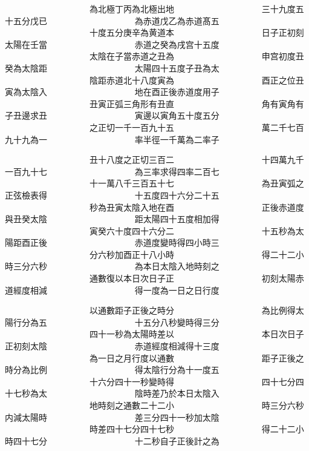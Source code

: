 \begin{正文}
　　　　　　　　　　為北極丁丙為北極出地
　　　　　　　　　　三十九度五十五分戊已
　　　　　　　　　　為赤道戊乙為赤道髙五
　　　　　　　　　　十度五分庚辛為黄道本
　　　　　　　　　　日子正初刻太陽在壬當
　　　　　　　　　　赤道之癸為戌宫十五度
　　　　　　　　　　太陰在子當赤道之丑為
　　　　　　　　　　申宫初度丑癸為太陰距
　　　　　　　　　　太陽四十五度子丑為太
　　　　　　　　　　陰距赤道北十八度寅為
　　　　　　　　　　酉正之位丑寅為太陰入
　　　　　　　　　　地在酉正後赤道度用子
　　　　　　　　　　丑寅正弧三角形有丑直
　　　　　　　　　　角有寅角有子丑邊求丑
　　　　　　　　　　寅邊以寅角五十度五分
　　　　　　　　　　之正切一千一百九十五
　　　　　　　　　　萬二千七百九十九為一
　　　　　　　　　　率半徑一千萬為二率子
\par
\end{正文}\clearpage
{}
\begin{正文}
　　　　　　　　　　丑十八度之正切三百二
　　　　　　　　　　十四萬九千一百九十七
　　　　　　　　　　為三率求得四率二百七
　　　　　　　　　　十一萬八千三百五十七
　　　　　　　　　　為丑寅弧之正弦檢表得
　　　　　　　　　　十五度四十六分二十五
　　　　　　　　　　秒為丑寅太陰入地在酉
　　　　　　　　　　正後赤道度與丑癸太陰
　　　　　　　　　　距太陽四十五度相加得
　　　　　　　　　　寅癸六十度四十六分二
　　　　　　　　　　十五秒為太陽距酉正後
　　　　　　　　　　赤道度變時得四小時三
　　　　　　　　　　分六秒加酉正十八小時
　　　　　　　　　　得二十二小時三分六秒
　　　　　　　　　　為本日太陰入地時刻之
　　　　　　　　　　通數復以本日次日子正
　　　　　　　　　　初刻太陽赤道經度相減
　　　　　　　　　　得一度為一日之日行度
\par
\end{正文}\clearpage
{}
\begin{正文}
　　　　　　　　　　以通數距子正後之時分
　　　　　　　　　　為比例得太陽行分為五
　　　　　　　　　　十五分八秒變時得三分
　　　　　　　　　　四十一秒為太陽時差以
　　　　　　　　　　本日次日子正初刻太陰
　　　　　　　　　　赤道經度相減得十三度
　　　　　　　　　　為一日之月行度以通數
　　　　　　　　　　距子正後之時分為比例
　　　　　　　　　　得太陰行分為十一度五
　　　　　　　　　　十六分四十一秒變時得
　　　　　　　　　　四十七分四十七秒為太
　　　　　　　　　　陰時差乃於本日太陰入
　　　　　　　　　　地時刻之通數二十二小
　　　　　　　　　　時三分六秒内減太陽時
　　　　　　　　　　差三分四十一秒加太陰
　　　　　　　　　　時差四十七分四十七秒
　　　　　　　　　　得二十二小時四十七分
　　　　　　　　　　十二秒自子正後計之為
\par
\end{正文}\clearpage
